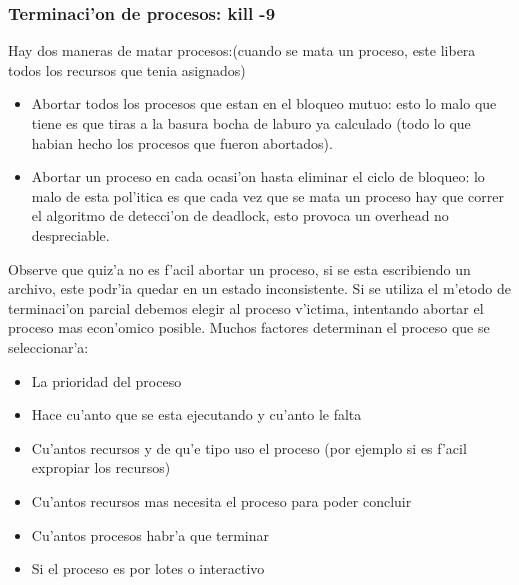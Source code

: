 \documentclass[a4paper,10pt]{article}
\begin{document}
\subsubsection{Terminaci'on de procesos: kill -9}
Hay dos maneras de matar procesos:(cuando se mata un proceso, este libera todos los recursos que tenia asignados)
\begin{itemize}
 \item Abortar todos los procesos que estan en el bloqueo mutuo: esto lo malo que tiene es que tiras a la basura bocha de laburo ya calculado (todo lo que habian hecho los procesos que fueron abortados).
 \item Abortar un proceso en cada ocasi'on hasta eliminar el ciclo de bloqueo: lo malo de esta pol'itica es que cada vez que se mata un proceso hay que correr el algoritmo de detecci'on de deadlock, esto provoca un overhead no despreciable.
\end{itemize}
Observe que quiz'a no es f'acil abortar un proceso, si se esta escribiendo un archivo, este podr'ia quedar en un estado inconsistente.
Si se utiliza el m'etodo de terminaci'on parcial debemos elegir al proceso v'ictima, intentando abortar el proceso mas econ'omico posible. Muchos factores determinan el proceso que se seleccionar'a:
\begin{itemize}
 \item La prioridad del proceso
 \item Hace cu'anto que se esta ejecutando y cu'anto le falta
 \item Cu'antos recursos y de qu'e tipo uso el proceso (por ejemplo si es f'acil expropiar los recursos)
 \item Cu'antos recursos mas necesita el proceso para poder concluir
 \item Cu'antos procesos habr'a que terminar
 \item Si el proceso es por lotes o interactivo
\end{itemize}
\end{document}
